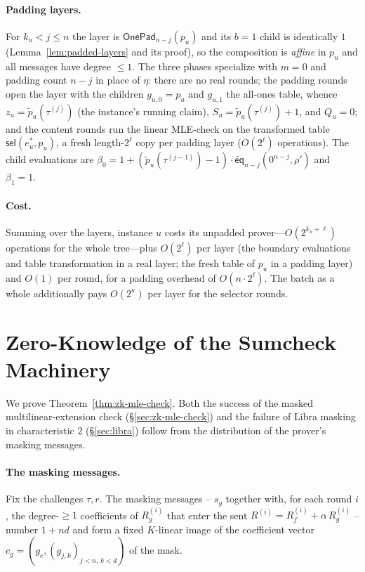\documentclass{article}
\theoremstyle{definition}
\newcommand*{\mle}{\widetilde}
\newcommand{\eq}{\mathsf{eq}}
\newcommand{\sel}{\textsf{sel}}
\begin{document}
\paragraph{Padding layers.}
For $k_u < j \leq n$ the layer is $\textsf{OnePad}_{n - j}(p_u)$ and its $b = 1$ child is identically $1$ (Lemma~\ref{lem:padded-layers} and its proof), so the composition is \emph{affine} in $p_u$ and all messages have degree $\leq 1$. The three phases specialize with $m = 0$ and padding count $n - j$ in place of $\eta$: there are no real rounds; the padding rounds open the layer with the children $g_{u, 0} = p_u$ and $g_{u, 1}$ the all-ones table, whence $z_u = \mle{p}_u(\tau^{(j)})$ (the instance's running claim), $S_u = \mle{p}_u(\tau^{(j)}) + 1$, and $Q_u = 0$; and the content rounds run the linear MLE-check on the transformed table $\sel(e^*_u, p_u)$, a fresh length-$2^\ell$ copy per padding layer ($O(2^\ell)$ operations). The child evaluations are $\beta_0 = 1 + (\mle{p}_u(\tau^{(j - 1)}) - 1) \cdot \mle{\eq}_{n - j}(0^{n - j}, \rho')$ and $\beta_1 = 1$.

\paragraph{Cost.}
Summing over the layers, instance $u$ costs its unpadded prover---$O(2^{k_u + \ell})$ operations for the whole tree---plus $O(2^\ell)$ per layer (the boundary evaluations and table transformation in a real layer; the fresh table of $p_u$ in a padding layer) and $O(1)$ per round, for a padding overhead of $O(n \cdot 2^\ell)$. The batch as a whole additionally pays $O(2^\kappa)$ per layer for the selector rounds.

\section{Zero-Knowledge of the Sumcheck Machinery}
\label{app:zk-sumcheck}

We prove Theorem~\ref{thm:zk-mle-check}. Both the success of the masked multilinear-extension check (\S\ref{sec:zk-mle-check}) and the failure of Libra masking in characteristic $2$ (\S\ref{sec:libra}) follow from the distribution of the prover's masking messages.

\paragraph{The masking messages.}
Fix the challenges $\tau, r$. The masking messages -- $s_g$ together with, for each round $i$, the degree-$\ge 1$ coefficients of $R_g^{(i)}$ that enter the sent $R^{(i)} = R_f^{(i)} + \alpha\, R_g^{(i)}$ -- number $1 + nd$ and form a fixed $K$-linear image of the coefficient vector $c_g = (g_c, (g_{j, k})_{j < n,\, k < d})$ of the mask.
\end{document}
